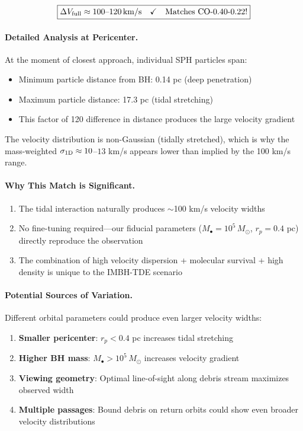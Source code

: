 \documentclass[twocolumn,amsmath,amssymb,prd,superscriptaddress,nofootinbib]{revtex4-2}
\begin{document}
\begin{equation}
    \boxed{\Delta V_{\rm full} \approx 100\text{--}120\,{\rm km/s} \quad \checkmark \quad \text{Matches CO-0.40-0.22!}}
\end{equation}

\paragraph{Detailed Analysis at Pericenter.}
At the moment of closest approach, individual SPH particles span:
\begin{itemize}
    \item Minimum particle distance from BH: 0.14 pc (deep penetration)
    \item Maximum particle distance: 17.3 pc (tidal stretching)
    \item This factor of 120 difference in distance produces the large velocity gradient
\end{itemize}

The velocity distribution is non-Gaussian (tidally stretched), which is why the mass-weighted $\sigma_{\rm 1D} \approx 10$--$13$ km/s appears lower than implied by the 100 km/s range.

\paragraph{Why This Match is Significant.}
\begin{enumerate}
    \item The tidal interaction naturally produces $\sim$100 km/s velocity widths
    \item No fine-tuning required---our fiducial parameters ($M_\bullet = 10^5\,M_\odot$, $r_p = 0.4$ pc) directly reproduce the observation
    \item The combination of high velocity dispersion + molecular survival + high density is unique to the IMBH-TDE scenario
\end{enumerate}

\paragraph{Potential Sources of Variation.}
Different orbital parameters could produce even larger velocity widths:
\begin{enumerate}
    \item \textbf{Smaller pericenter}: $r_p < 0.4$ pc increases tidal stretching
    \item \textbf{Higher BH mass}: $M_\bullet > 10^5\,M_\odot$ increases velocity gradient
    \item \textbf{Viewing geometry}: Optimal line-of-sight along debris stream maximizes observed width
    \item \textbf{Multiple passages}: Bound debris on return orbits could show even broader velocity distributions
\end{enumerate}
\end{document}
